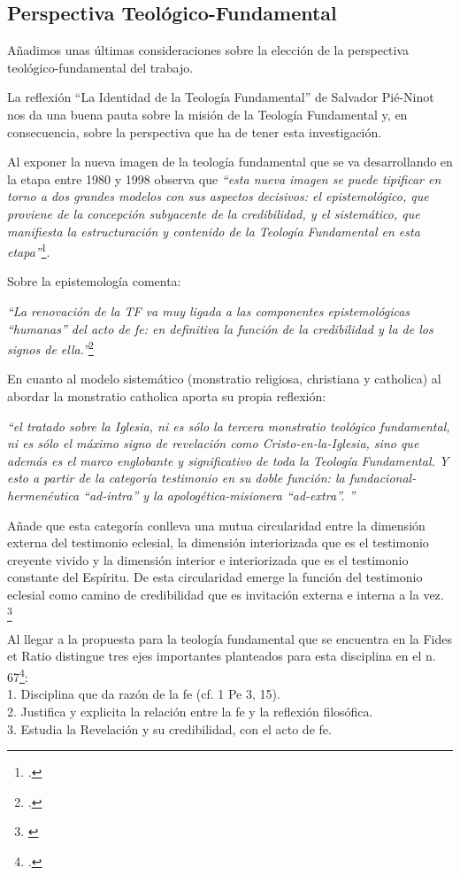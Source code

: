 \documentclass[11pt]{article}
\begin{document}
\subsection{Perspectiva Teológico-Fundamental}

Añadimos unas últimas consideraciones sobre la elección de la perspectiva teológico-fundamental del trabajo. 

La reflexión ``La Identidad de la Teología Fundamental'' de Salvador Pié-Ninot nos da una buena pauta sobre la misión de la Teología Fundamental y, en consecuencia, sobre la perspectiva que ha de tener esta investigación. 

Al exponer la nueva imagen de la teología fundamental que se va desarrollando en la etapa entre 1980 y 1998 observa que \emph{``esta nueva imagen se puede tipificar en torno a dos grandes modelos con sus aspectos decisivos: el epistemológico, que proviene de la concepción subyacente de la credibilidad, y el sistemático, que manifiesta la estructuración y contenido de la Teología Fundamental en esta etapa''}\footcite[29]{ninotTF}.

Sobre la epistemología comenta:

\emph{
``La renovación de la TF va muy ligada a las componentes epistemológicas ``humanas'' del acto de fe: en definitiva la función de la credibilidad y la de los signos de ella.''}\footcite[31]{ninotTF}

En cuanto al modelo sistemático (monstratio religiosa, christiana y catholica) al abordar la monstratio catholica aporta su propia reflexión:

\emph{
``el tratado sobre la Iglesia, ni es sólo la tercera monstratio teológico fundamental, ni es sólo el máximo signo de revelación como Cristo-en-la-Iglesia, sino que además es el marco englobante y significativo de toda la Teología Fundamental. Y esto a partir de la categoría testimonio en su doble función: la fundacional-hermenéutica ``ad-intra'' y la apologética-misionera ``ad-extra''. ''}

Añade que esta categoría conlleva una mutua circularidad entre la dimensión externa del testimonio eclesial, la dimensión interiorizada que es el testimonio creyente vivido y la dimensión interior e interiorizada que es el testimonio constante del Espíritu. De esta circularidad emerge la función del testimonio eclesial como camino de credibilidad que es invitación externa e interna a la vez. \footnote{\cite[40]{ninotTF}}

Al llegar a la propuesta para la teología fundamental que se encuentra en la Fides et Ratio distingue tres ejes importantes planteados para esta disciplina en el n. 67\footcite[49]{ninotTF}:\\1. Disciplina que da razón de la fe (cf. 1 Pe 3, 15).\\
2. Justifica y explicita la relación entre la fe y la reflexión filosófica.\\
3. Estudia la Revelación y su credibilidad, con el acto de fe.
\end{document}
